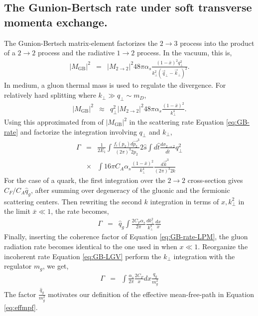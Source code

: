 \documentclass[aps, prc, reprint, amsmath, groupedaddress, nofootinbib]{revtex4-1}
\begin{document}
\begin{appendices}
\section{The Gunion-Bertsch rate under soft transverse momenta exchange.}
\label{app:consistency}
The Gunion-Bertsch matrix-element factorizes the $2\rightarrow3$ process into the product of a $2\rightarrow2$ process and the radiative $1\rightarrow 2$ process. 
In the vacuum, this is,
\begin{eqnarray}
|M_{\textrm{GB}}|^2 &=& |M_{2\rightarrow 2}|^2 48 \pi \alpha_s \frac{(1-\bar{x})^2q_\perp^2}{k_\perp^2\left(\vec{q}_\perp-\vec{k}_\perp\right)^2}.
\end{eqnarray}
In medium, a gluon thermal mass is used to regulate the divergence. 
For relatively hard splitting where $k_\perp \gg q_\perp \sim m_D$, 
\begin{eqnarray}
|M_{\textrm{GB}}|^2 &\approx & q_\perp^2 |M_{2\rightarrow 2}|^2 48 \pi \alpha_s \frac{(1-\bar{x})^2}{k_\perp^4}.
\end{eqnarray}
Using this approximated from of $|M_{\textrm{GB}}|^2$ in the scattering rate Equation \ref{eq:GB-rate} and factorize the integration involving $q_\perp$ and $k_\perp$,
\begin{eqnarray}
\Gamma &=& \frac{1}{2E_1}\int\frac{f_i(p_2)d\vec{p_2}^3}{(2\pi)^3 2p_2}2\hat{s}\int d\hat{t}\frac{d\sigma_{2\rightarrow 2}}{d\hat{t}}q_\perp^2
\nonumber \\
&\times& \int 16\pi C_A \alpha_s \frac{(1-\bar{x})^2}{k_\perp^4} \frac{d\vec{k}^3}{(2\pi)^3 2k}
\end{eqnarray}
For the case of a quark, the first integration over the $2\rightarrow 2$ cross-section gives $C_F/C_A\hat{q}_g$, after summing over degeneracy of the gluonic and the fermionic scattering centers.
Then rewriting the second $k$ integration in terms of $x, k_\perp^2$ in the limit $\bar{x}\ll 1$, the rate becomes,
\begin{eqnarray}\label{eq:GB-LGV}
\Gamma &=& \hat{q}_g \int \frac{2C_F\alpha_s}{2\pi} \frac{dk_\perp^2}{k_\perp^4} \frac{dx}{x}
\end{eqnarray}
Finally, inserting the coherence factor of Equation \ref{eq:GB-rate-LPM}, the gluon radiation rate becomes identical to the one used in \cite{Cao:2013ita} when $x\ll 1$.
Reorganize the incoherent rate Equation \ref{eq:GB-LGV} perform the $k_\perp$ integration with the regulator $m_g$, we get,
\begin{eqnarray}
\Gamma &=& \int \frac{\alpha_s}{2\pi} \frac{2C_F}{x}dx \frac{q_g}{m_g^2} 
\end{eqnarray}
The factor $\frac{\hat{q}_g}{m_g^2}$ motivates our definition of the effective mean-free-path in Equation \ref{eq:effmpf}.


\end{appendices}
\end{document}
